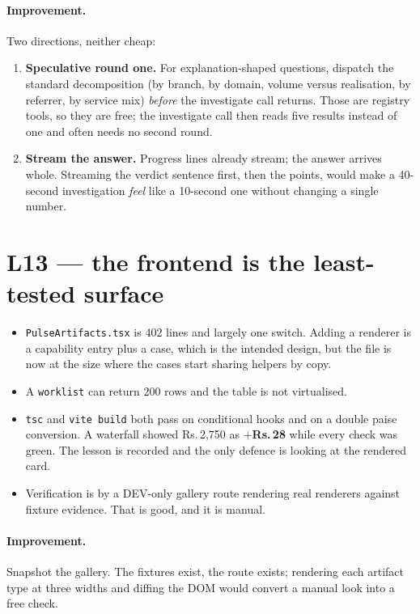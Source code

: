 \documentclass[11pt,a4paper]{report}
\newcommand{\rs}[1]{Rs.\,#1}
\newcommand{\code}[1]{\texttt{\small #1}}
\begin{document}
\paragraph{Improvement.} Two directions, neither cheap:
\begin{enumerate}[leftmargin=*,itemsep=1pt]
\item \textbf{Speculative round one.} For explanation-shaped questions, dispatch the standard
      decomposition (by branch, by domain, volume versus realisation, by referrer, by service mix)
      \emph{before} the investigate call returns. Those are registry tools, so they are free; the
      investigate call then reads five results instead of one and often needs no second round.
\item \textbf{Stream the answer.} Progress lines already stream; the answer arrives whole. Streaming
      the verdict sentence first, then the points, would make a 40-second investigation \emph{feel}
      like a 10-second one without changing a single number.
\end{enumerate}

\section{L13 --- the frontend is the least-tested surface}

\begin{itemize}[leftmargin=*,itemsep=2pt]
\item \code{PulseArtifacts.tsx} is 402 lines and largely one switch. Adding a renderer is a
      capability entry plus a case, which is the intended design, but the file is now at the size
      where the cases start sharing helpers by copy.
\item A \code{worklist} can return 200 rows and the table is not virtualised.
\item \code{tsc} and \code{vite build} both pass on conditional hooks and on a double paise
      conversion. A waterfall showed \rs{2{,}750} as \textbf{$+$\rs{28}} while every check was
      green. The lesson is recorded and the only defence is looking at the rendered card.
\item Verification is by a DEV-only gallery route rendering real renderers against fixture evidence.
      That is good, and it is manual.
\end{itemize}

\paragraph{Improvement.} Snapshot the gallery. The fixtures exist, the route exists; rendering each
artifact type at three widths and diffing the DOM would convert a manual look into a free check.
\end{document}
